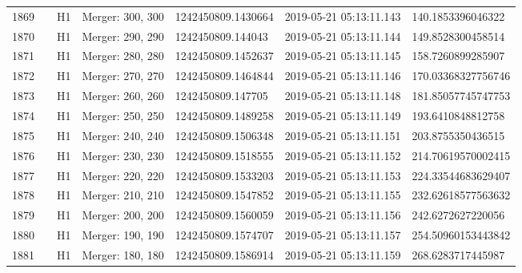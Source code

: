 \begin{longtable}{lllllll}
1869 &                                                    &       H1 &  Merger: 300, 300 &  1242450809.1430664 &  2019-05-21 05:13:11.143 &   140.1853396046322 \\
1870 &                                                    &       H1 &  Merger: 290, 290 &   1242450809.144043 &  2019-05-21 05:13:11.144 &   149.8528300458514 \\
1871 &                                                    &       H1 &  Merger: 280, 280 &  1242450809.1452637 &  2019-05-21 05:13:11.145 &   158.7260899285907 \\
1872 &                                                    &       H1 &  Merger: 270, 270 &  1242450809.1464844 &  2019-05-21 05:13:11.146 &  170.03368327756746 \\
1873 &                                                    &       H1 &  Merger: 260, 260 &   1242450809.147705 &  2019-05-21 05:13:11.148 &  181.85057745747753 \\
1874 &                                                    &       H1 &  Merger: 250, 250 &  1242450809.1489258 &  2019-05-21 05:13:11.149 &   193.6410848812758 \\
1875 &                                                    &       H1 &  Merger: 240, 240 &  1242450809.1506348 &  2019-05-21 05:13:11.151 &   203.8755350436515 \\
1876 &                                                    &       H1 &  Merger: 230, 230 &  1242450809.1518555 &  2019-05-21 05:13:11.152 &  214.70619570002415 \\
1877 &                                                    &       H1 &  Merger: 220, 220 &  1242450809.1533203 &  2019-05-21 05:13:11.153 &  224.33544683629407 \\
1878 &                                                    &       H1 &  Merger: 210, 210 &  1242450809.1547852 &  2019-05-21 05:13:11.155 &  232.62618577563632 \\
1879 &                                                    &       H1 &  Merger: 200, 200 &  1242450809.1560059 &  2019-05-21 05:13:11.156 &   242.6272627220056 \\
1880 &                                                    &       H1 &  Merger: 190, 190 &  1242450809.1574707 &  2019-05-21 05:13:11.157 &  254.50960153443842 \\
1881 &                                                    &       H1 &  Merger: 180, 180 &  1242450809.1586914 &  2019-05-21 05:13:11.159 &   268.6283717445987 \\

\end{longtable}
